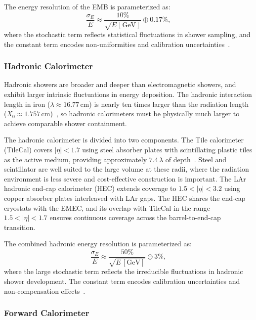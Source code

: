The energy resolution of the EMB is parameterized as:
%
\begin{equation}
	\frac{\sigma_E}{E} \approx \frac{10\%}{\sqrt{E\,[\text{GeV}]}} \oplus 0.17\%,
	\label{eq:em_resolution}
\end{equation}
%
where the stochastic term reflects statistical fluctuations in shower sampling, and the constant term encodes non-uniformities and calibration uncertainties~\cite{atlas}.

\subsubsection{Hadronic Calorimeter}

Hadronic showers are broader and deeper than electromagnetic showers, and exhibit larger intrinsic fluctuations in energy deposition. 
The hadronic interaction length in iron ($\lambda \approx 16.77$\,cm) is nearly ten times larger than the radiation length ($X_0 \approx 1.757$\,cm)~\cite{PDG2022}, so hadronic calorimeters must be physically much larger to achieve comparable shower containment.

The hadronic calorimeter is divided into two components. 
The Tile calorimeter (TileCal) covers $|\eta| < 1.7$ using steel absorber plates with scintillating plastic tiles as the active medium, providing approximately $7.4\,\lambda$ of depth~\cite{atlas}. 
Steel and scintillator are well suited to the large volume at these radii, where the radiation environment is less severe and cost-effective construction is important.
The LAr hadronic end-cap calorimeter (HEC) extends coverage to $1.5 < |\eta| < 3.2$ using copper absorber plates interleaved with LAr gaps. 
The HEC shares the end-cap cryostats with the EMEC, and its overlap with TileCal in the range $1.5 < |\eta| < 1.7$ ensures continuous coverage across the barrel-to-end-cap transition.

The combined hadronic energy resolution is parameterized as:
%
\begin{equation}
	\frac{\sigma_E}{E} \approx \frac{50\%}{\sqrt{E\,[\text{GeV}]}} \oplus 3\%,
	\label{eq:had_resolution}
\end{equation}
%
where the large stochastic term reflects the irreducible fluctuations in hadronic shower development. 
The constant term encodes calibration uncertainties and non-compensation effects~\cite{atlas}.

\subsubsection{Forward Calorimeter}

